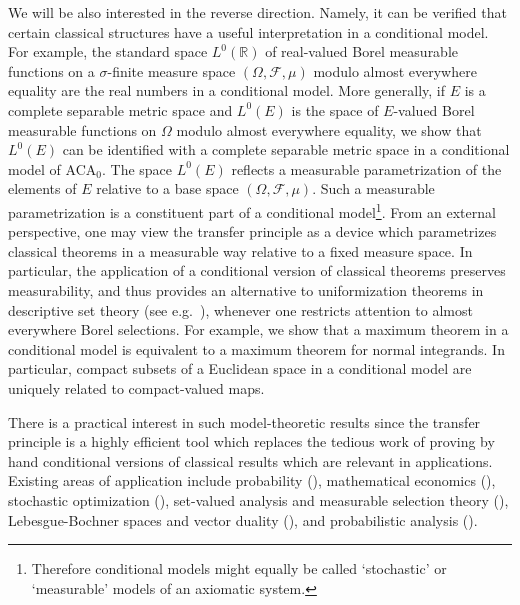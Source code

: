 \documentclass{jloganal}
\numberwithin{equation}{section}
\theoremstyle{plain}
\begin{document}
We will be also interested in the reverse direction. 
Namely, it can be verified that certain classical structures have a useful interpretation in a conditional model.  
For example, the standard space $L^0(\mathbb{R})$ of real-valued Borel measurable functions on a $\sigma$-finite measure space $(\Omega,\mathcal{F},\mu)$ modulo almost everywhere equality are the real numbers in a conditional 
model.  
More generally, if $E$ is a complete separable metric space and $L^0(E)$ is the space of $E$-valued Borel measurable functions on $\Omega$ modulo almost everywhere equality, 
we show that $L^0(E)$ can be identified with a complete separable metric space in a conditional model of ACA$_{0}$.  
The space $L^0(E)$ reflects a measurable parametrization of the elements of $E$ relative to a base space $(\Omega,\mathcal{F},\mu)$.  
Such a measurable parametrization is a constituent part of a conditional model\footnote{Therefore conditional models might equally be called `stochastic' or `measurable' models of an axiomatic system.}. 
From an external perspective, one may view the transfer principle as a device which parametrizes classical theorems in a measurable way relative to a fixed measure space. 
In particular, the application of a conditional version of classical theorems preserves measurability, and thus provides an 
alternative to uniformization theorems in descriptive set theory (see e.g.~\cite{kechris1995classical,molchanov2005theory,rockafellar02}), whenever one restricts attention to almost everywhere Borel selections.  
For example, we show that a maximum theorem in a conditional model is equivalent to a maximum theorem for normal integrands.  
In particular, compact subsets of a Euclidean space in a conditional model are uniquely related to compact-valued maps.  

There is a practical interest in such model-theoretic results since the transfer principle is a highly efficient tool which replaces the tedious 
work of proving by hand conditional versions of classical results which are relevant in applications.  Existing areas of application include probability (\cite{jamneshan2017measures}), 
mathematical economics (\cite{backhoff2016conditional,bielecki2016dynamic,cheridito2016equilibrium,drapeau2016conditional,filipovic2012approaches,frittelli2011conditional,frittelli2014complete,hansen1987role,kabanov2001teachers}), 
stochastic optimization (\cite{cheridito2011optimal,cheridito2013bsdes,jamneshan2017parameter}), set-valued analysis and measurable selection theory (\cite{jamneshan2017parameter,jamneshan2017compact}), Lebesgue-Bochner spaces and vector duality (\cite{drapeau2017fenchel,grad2018perturbational}), and probabilistic analysis (\cite{guo2010relations,guo2013homo,guo2009separation,guo2011neumann,jamneshan2017compact}).  
\end{document}
